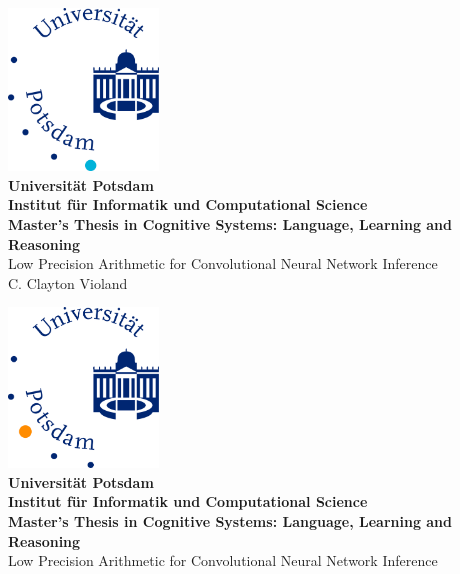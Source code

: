 \documentclass[12pt]{report}
\begin{document}
\nocite{*} %
\hoffset=5mm
\thispagestyle{empty}

\begin{center}
	\bigskip \bigskip \bigskip 
	\includegraphics[width=0.30\textwidth]{figures/06_Matjpg.jpg} \\
	\vspace*{0.8cm}
	{\huge \bf Universität Potsdam} \\
	\bigskip \bigskip \bigskip
	{\huge \bf Institut für Informatik und Computational Science} \\
	\bigskip \bigskip \bigskip
	{\Large \bf Master's Thesis in Cognitive Systems: Language, Learning and Reasoning} \\
	\bigskip \bigskip \bigskip \bigskip \bigskip
	{\Large Low Precision Arithmetic for Convolutional Neural Network Inference} \\        
	\bigskip \bigskip \bigskip \bigskip
	{\Large C. Clayton Violand} \\    
	\bigskip 
\end{center}

\vfill

\newpage
\hoffset=5mm
\thispagestyle{empty}

\begin{center}
	\bigskip \bigskip \bigskip 
	\includegraphics[width=0.30\textwidth]{figures/04_Humjpg.jpg} \\
	\vspace*{0.8cm}
	{\huge \bf Universität Potsdam} \\
	\bigskip \bigskip \bigskip
	{\huge \bf Institut für Informatik und Computational Science } \\
	\bigskip \bigskip \bigskip
	{\Large \bf Master's Thesis in Cognitive Systems: Language, Learning and Reasoning} \\
	\bigskip \bigskip \bigskip \bigskip \bigskip
	{\Large Low Precision Arithmetic for Convolutional Neural Network Inference} \\
	\bigskip
\end{center}
\end{document}
